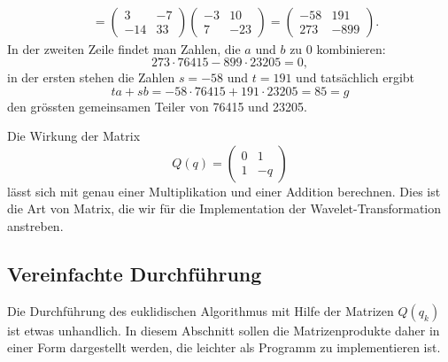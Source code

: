 \begin{beispiel}
\begin{align*}
{}_{}
\\ &=
\begin{pmatrix}  3 &  -7 \\ -14 &  33 \end{pmatrix}
\begin{pmatrix} -3 &  10 \\   7 & -23 \end{pmatrix}
=
\begin{pmatrix} -58 & 191 \\ 273 & -899 \end{pmatrix}.
\end{align*}
In der zweiten Zeile findet man Zahlen, die $a$ und $b$ zu 0 kombinieren:
\[
273 \cdot 76415 - 899 \cdot 23205 = 0,
\]
in der ersten stehen die Zahlen $s=-58$ und $t=191$ und tatsächlich
ergibt
\[
ta+sb = -58\cdot 76415  + 191\cdot 23205 = 85 = g
\]
den grössten gemeinsamen Teiler von 76415 und 23205.
\end{beispiel}

Die Wirkung der Matrix
\[
Q(q) = \begin{pmatrix} 0 & 1 \\ 1 & -q \end{pmatrix}
\]
lässt sich mit genau einer Multiplikation und einer Addition
berechnen.
Dies ist die Art von Matrix, die wir für die Implementation der
Wavelet-Transformation anstreben.

%
%
\subsection{Vereinfachte Durchführung
\label{buch:endlichekoerper:subsection:matrixschreibweise}}
Die Durchführung des euklidischen Algorithmus mit Hilfe der Matrizen
$Q(q_k)$ ist etwas unhandlich.
In diesem Abschnitt sollen die Matrizenprodukte daher in einer Form
dargestellt werden, die leichter als Programm zu implementieren ist.

